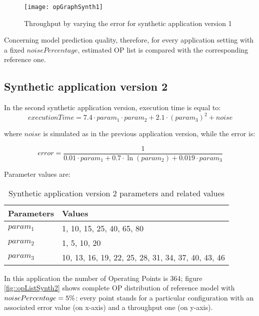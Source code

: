\begin{figure}[h]

    \centering
    \texttt{[image: opGraphSynth1]}
    \caption{Throughput by varying the error for synthetic application version 1}
    \label{fig::opListSynth1}
    
\end{figure}

Concerning model prediction quality, therefore, for every application setting with a fixed $noisePercentage$, estimated OP list is compared with the corresponding reference one.


\subsection{Synthetic application version 2}

In the second synthetic application version, execution time is equal to:
\[
executionTime = 7.4 \cdot param_1 \cdot param_2 + 2.1 \cdot (param_3)^2 + noise
\]

where $noise$ is simulated as in the previous application version, while the error is:

\[
error = \dfrac{1}{0.01 \cdot param_1 + 0.7 \cdot \ln{(param_2)} + 0.019 \cdot param_3}
\]

Parameter values are:

\begin{table}[h]

    \centering

    \begin{tabular}{ll}
    
        \toprule
        Parameters & Values \\
        \midrule
        $param_1$ & 1, 10, 15, 25, 40, 65, 80 \\
        $param_2$ & 1, 5, 10, 20 \\
        $param_3$ & 10, 13, 16, 19, 22, 25, 28, 31, 34, 37, 40, 43, 46 \\
        \bottomrule 
    
    \end{tabular}

    \caption{Synthetic application version 2 parameters and related values}

\end{table}

In this application the number of Operating Points is 364; figure \ref{fig::opListSynth2} shows complete OP distribution of reference model with $noise\-Per\-cent\-age = 5\%$: every point stands for a particular configuration with an associated error value (on x-axis) and a throughput one (on y-axis).

